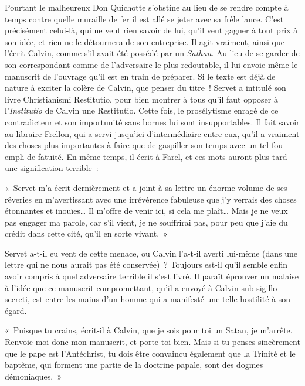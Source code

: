 \documentclass[french,twoside]{book} %
\newcommand{\astermono}{\medskip\centerline{\color{rubric}\large\selectfont{\syms ✻}}\medskip\par}%
\newenvironment{quoteblock}%
  {\begin{quoting}}
  {\end{quoting}}
\newenvironment{quotebar}{%
    \def\FrameCommand{{\color{rubric!10!}\vrule width 0.5em} \hspace{0.9em}}%
    \def\OuterFrameSep{2pt} %
    \MakeFramed {\advance\hsize-\width \FrameRestore}
  }%
  {%
    \endMakeFramed
  }
\renewenvironment{quoteblock}%
  {%
    \savenotes
    \setstretch{0.9}
    \normalfont
    \begin{quotebar}
  }
  {%
    \end{quotebar}
    \spewnotes
  }
\begin{document}
Pourtant le malheureux Don Quichotte s’obstine au lieu de se rendre compte à temps contre quelle muraille de fer il est allé se jeter avec sa frêle lance. C’est précisément celui-là, qui ne veut rien savoir de lui, qu’il veut gagner à tout prix à son idée, et rien ne le détournera de son entreprise. Il agit vraiment, ainsi que l’écrit Calvin, comme s’il avait été possédé par un \emph{Sathan}. Au lieu de se garder de son correspondant comme de l’adversaire le plus redoutable, il lui envoie même le manuscrit de l’ouvrage qu’il est en train de préparer. Si le texte est déjà de nature à exciter la colère de Calvin, que penser du titre ! Servet a intitulé son livre Christianismi Restitutio, pour bien montrer à tous qu’il faut opposer à l’\emph{Institutio} de Calvin une Restitutio. Cette fois, le prosélytisme enragé de ce contradicteur et son importunité sans bornes lui sont insupportables. Il fait savoir au libraire Frellon, qui a servi jusqu’ici d’intermédiaire entre eux, qu’il a vraiment des choses plus importantes à faire que de gaspiller son temps avec un tel fou empli de fatuité. En même temps, il écrit à Farel, et ces mots auront plus tard une signification terrible :\par

\begin{quoteblock}
\noindent « Servet m’a écrit dernièrement et a joint à sa lettre un énorme volume de ses rêveries en m’avertissant avec une irrévérence fabuleuse que j’y verrais des choses étonnantes et inouïes… Il m’offre de venir ici, si cela me plaît… Mais je ne veux pas engager ma parole, car s’il vient, je ne souffrirai pas, pour peu que j’aie du crédit dans cette cité, qu’il en sorte vivant. »\end{quoteblock}


\astermono

\noindent Servet a-t-il eu vent de cette menace, ou Calvin l’a-t-il averti lui-même (dans une lettre qui ne nous aurait pas été conservée) ? Toujours est-il qu’il semble enfin avoir compris à quel adversaire terrible il s’est livré. Il paraît éprouver un malaise à l’idée que ce manuscrit compromettant, qu’il a envoyé à Calvin sub sigillo secreti, est entre les mains d’un homme qui a manifesté une telle hostilité à son égard.\par

\begin{quoteblock}
\noindent « Puisque tu crains, écrit-il à Calvin, que je sois pour toi un Satan, je m’arrête. Renvoie-moi donc mon manuscrit, et porte-toi bien. Mais si tu penses sincèrement que le pape est l’Antéchrist, tu dois être convaincu également que la Trinité et le baptême, qui forment une partie de la doctrine papale, sont des dogmes démoniaques. »\end{quoteblock}
\end{document}

